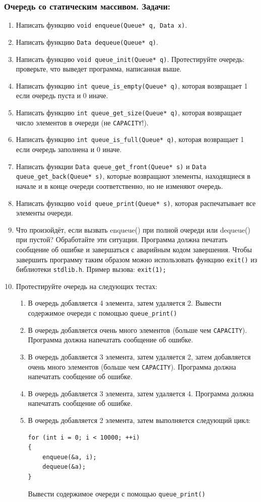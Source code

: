 \documentclass{article}
\begin{document}
\subsubsection*{Очередь со статическим массивом. Задачи:}
\begin{enumerate}
\item Написать функцию \texttt{void enqueue(Queue* q, Data x)}.
\item Написать функцию \texttt{Data dequeue(Queue* q)}.
\item Написать функцию \texttt{void queue\_init(Queue* q)}.
 Протестируйте очередь: проверьте, что выведет программа, написанная выше.
\item Написать функцию \texttt{int queue\_is\_empty(Queue* q)}, которая возвращает 1 если очередь пуста и 0 иначе.
\item Написать функцию \texttt{int queue\_get\_size(Queue* q)}, которая возвращает число элементов в очереди (не \texttt{CAPACITY}!).
\item Написать функцию \texttt{int queue\_is\_full(Queue* q)}, которая возвращает 1 если очередь заполнена и 0 иначе.
\item Написать функции \texttt{Data queue\_get\_front(Queue* s)} и \texttt{Data queue\_get\_back(Queue* s)}, которые возвращают элементы, находящиеся в начале и в конце очереди соответственно, но не изменяют очередь.
\item Написать функцию \texttt{void queue\_print(Queue* s)}, которая распечатывает все элементы очереди.
\item Что произойдёт, если вызвать enqueue() при полной очереди или dequeue() при пустой? Обработайте эти ситуации. Программа должна печатать сообщение об ошибке и завершаться с аварийным кодом завершения. Чтобы завершить программу таким образом можно использовать функцию \texttt{exit()} из библиотеки \texttt{stdlib.h}. Пример вызова: \texttt{exit(1);}
\newpage
\item Протестируйте очередь на следующих тестах:
\begin{enumerate}
\item В очередь добавляется 4 элемента, затем удаляется 2. Вывести содержимое очереди с помощью \texttt{queue\_print()}
\item В очередь добавляется очень много элементов (больше чем \texttt{CAPACITY}). Программа должна напечатать сообщение об ошибке.
\item В очередь добавляется 3 элемента, затем удаляется 2, затем добавляется очень много элементов (больше чем \texttt{CAPACITY}). Программа должна напечатать сообщение об ошибке.
\item В очередь добавляется 3 элемента, затем удаляется 4. Программа должна напечатать сообщение об ошибке.
\item В очередь добавляется 2 элемента, затем выполняется следующий цикл:
\begin{verbatim}
for (int i = 0; i < 10000; ++i)
{
    enqueue(&a, i);
    dequeue(&a);
}
\end{verbatim}
Вывести содержимое очереди с помощью \texttt{queue\_print()}
\end{enumerate}


\end{enumerate}
\end{document}
